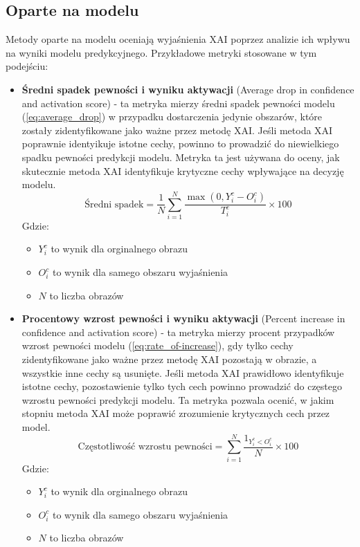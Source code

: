 \subsection*{Oparte na modelu}
Metody oparte na modelu oceniają wyjaśnienia XAI poprzez analizie ich wpływu na wyniki modelu predykcyjnego.
Przykładowe metryki stosowane w tym podejściu:
\begin{itemize}
	\item \textbf{Średni spadek pewności i wyniku aktywacji}\cite{9093360} (Average drop in confidence and activation score) - ta metryka mierzy średni spadek pewności modelu (\ref{eq:average_drop}) w przypadku dostarczenia jedynie obszarów, które zostały zidentyfikowane jako ważne przez metodę XAI.
	      Jeśli metoda XAI poprawnie identyikuje istotne cechy, powinno to prowadzić do niewielkiego spadku pewności predykcji modelu.
	      Metryka ta jest używana do oceny, jak skutecznie metoda XAI identyfikuje krytyczne cechy wpływające na decyzję modelu.
	      \begin{equation}
		      \text{Średni spadek} = \frac{1}{N} \sum_{i=1}^{N} \frac{\max(0,Y_i^c-O_i^c)}{T_i^c} \times 100
		      \label{eq:average_drop}
	      \end{equation}
	      Gdzie:
	      \begin{itemize}[label=]
		      \item $Y_i^c$ to wynik dla orginalnego obrazu
		      \item $O_i^c$ to wynik dla samego obszaru wyjaśnienia
		      \item $N$ to liczba obrazów
	      \end{itemize}
	\item \textbf{Procentowy wzrost pewności i wyniku aktywacji}\cite{9093360} (Percent increase in confidence and activation score) - ta metryka mierzy procent przypadków wzrost pewności modelu (\ref{eq:rate_of-increase}), gdy tylko cechy zidentyfikowane jako ważne przez metodę XAI pozostają w obrazie, a wszystkie inne cechy są usunięte.
	      Jeśli metoda XAI prawidłowo identyfikuje istotne cechy, pozostawienie tylko tych cech powinno prowadzić do częstego wzrostu pewności predykcji modelu.
	      Ta metryka pozwala ocenić, w jakim stopniu metoda XAI może poprawić zrozumienie krytycznych cech przez model.
	      \begin{equation}
		      \text{Częstotliwość wzrostu pewności} =  \sum_{i=1}^{N} \frac{1_{Y_i^c<O_i^c}}{N} \times 100
		      \label{eq:rate_of-increase}
	      \end{equation}
	      Gdzie:
	      \begin{itemize}[label=]
		      \item $Y_i^c$ to wynik dla orginalnego obrazu
		      \item $O_i^c$ to wynik dla samego obszaru wyjaśnienia
		      \item $N$ to liczba obrazów
	      \end{itemize}
\end{itemize}

